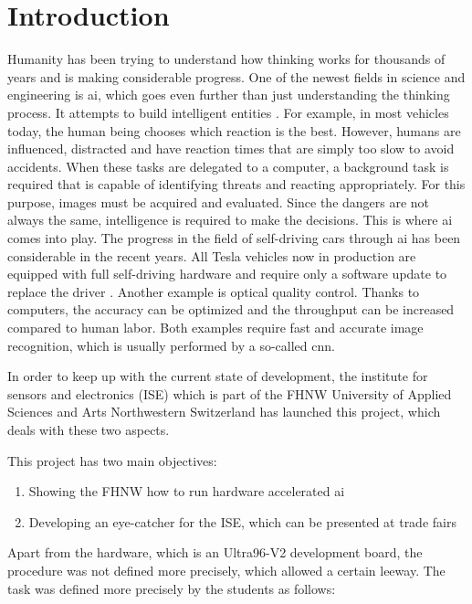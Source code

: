 \chapter*{Introduction}
\label{ch:introduction}

Humanity has been trying to understand how thinking works for thousands of years and is making considerable progress.
One of the newest fields in science and engineering is \acrfull{ai}, which goes even further than just understanding the thinking process.
It attempts to build intelligent entities \cite{ai}.
For example, in most vehicles today, the human being chooses which reaction is the best.
However, humans are influenced, distracted and have reaction times that are simply too slow to avoid accidents.
When these tasks are delegated to a computer, a background task is required that is capable of identifying threats and reacting appropriately.
For this purpose, images must be acquired and evaluated.
Since the dangers are not always the same, intelligence is required to make the decisions.
This is where \acrshort{ai} comes into play.
The progress in the field of self-driving cars through \acrshort{ai} has been considerable in the recent years.
All Tesla vehicles now in production are equipped with full self-driving hardware and require only a software update to replace the driver \cite{tesla_self_driving_cars}.
Another example is optical quality control.
Thanks to computers, the accuracy can be optimized and the throughput can be increased compared to human labor.
Both examples require fast and accurate image recognition, which is usually performed by a so-called \acrfull{cnn}.

In order to keep up with the current state of development, the institute for sensors and electronics (ISE) which is part of the FHNW University of Applied Sciences and Arts Northwestern Switzerland has launched this project, which deals with these two aspects.

This project has two main objectives:

\begin{enumerate}
	\item Showing the FHNW how to run hardware accelerated \acrshort{ai}
	\item Developing an eye-catcher for the ISE, which can be presented at trade fairs
\end{enumerate}

Apart from the hardware, which is an Ultra96-V2 development board, the procedure was not defined more precisely, which allowed a certain leeway.
The task was defined more precisely by the students as follows:

